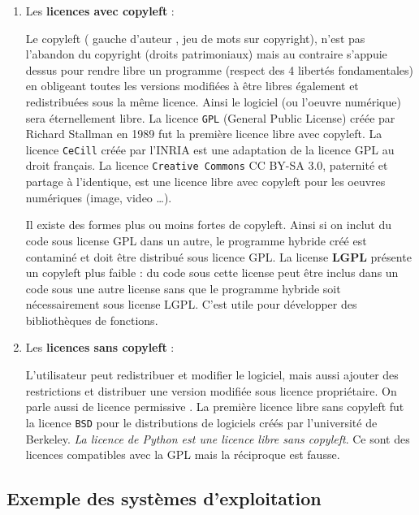 \documentclass[
  11pt,
]{article}
\newcounter{prop}
\newcounter{def}
\newcounter{prog}
\newcounter{logi}
\begin{document}
\begin{enumerate}
\def\labelenumi{\arabic{enumi}.}
\item
  Les \textbf{licences avec copyleft} :

  Le copyleft ( gauche d'auteur , jeu de mots sur copyright), n'est pas
  l'abandon du copyright (droits patrimoniaux) mais au contraire
  s'appuie dessus pour rendre libre un programme (respect des 4 libertés
  fondamentales) en obligeant toutes les versions modifiées à être
  libres également et redistribuées sous la même licence. Ainsi le
  logiciel (ou l'oeuvre numérique) sera éternellement libre. La licence
  \texttt{GPL} (General Public License) créée par Richard Stallman en
  1989 fut la première licence libre avec copyleft. La licence
  \texttt{CeCill} créée par l'INRIA est une adaptation de la licence GPL
  au droit français. La licence \texttt{Creative\ Commons} CC BY-SA 3.0,
  paternité et partage à l'identique, est une licence libre avec
  copyleft pour les oeuvres numériques (image, video \ldots).

  Il existe des formes plus ou moins fortes de copyleft. Ainsi si on
  inclut du code sous license GPL dans un autre, le programme hybride
  créé est contaminé et doit être distribué sous licence GPL. La license
  \textbf{LGPL} présente un copyleft plus faible : du code sous cette
  license peut être inclus dans un code sous une autre license sans que
  le programme hybride soit nécessairement sous license LGPL. C'est
  utile pour développer des bibliothèques de fonctions.
\item
  Les \textbf{licences sans copyleft} :

  L'utilisateur peut redistribuer et modifier le logiciel, mais aussi
  ajouter des restrictions et distribuer une version modifiée sous
  licence propriétaire. On parle aussi de licence permissive . La
  première licence libre sans copyleft fut la licence \texttt{BSD} pour
  le distributions de logiciels créés par l'université de Berkeley.
  \emph{La licence de Python est une licence libre sans copyleft}. Ce
  sont des licences compatibles avec la GPL mais la réciproque est
  fausse.
\end{enumerate}

\hypertarget{exemple-des-systuxe8mes-dexploitation}{%
\subsection{Exemple des systèmes
d'exploitation}\label{exemple-des-systuxe8mes-dexploitation}}
\end{document}
